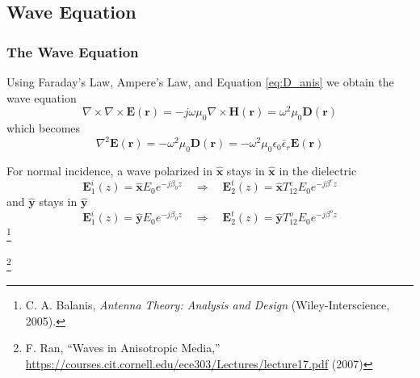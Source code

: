 \documentclass[aspectratio=169,t,xcolor=table]{beamer}
\newcommand{\bv}[1]{\mathbf{#1}}
\newcommand{\vecc}[1]{\mathbf{#1}}
\newcommand\blfootnote[1]{%
  \begingroup
  \renewcommand\thefootnote{}\footnote[frame]{\tiny #1}%
  \addtocounter{footnote}{-1}%
  \endgroup
}
\begin{document}
\subsection{Wave Equation}
\begin{frame}
    \frametitle{The Wave Equation}
    Using Faraday's Law, Ampere's Law, and Equation \eqref{eq:D_anis} we obtain
    the wave equation \cite{Balanis-2012, Wav_anis}
    \begin{equation}\label{eq:WaveEQ}
        \nabla \times \nabla \times \vecc{E}(\bv{r}) = 
        -j\omega \mu_0 \nabla \times \vecc{H}(\vecc{r}) = 
    \omega^2\mu_0 \vecc{D}(\vecc{r})
    \end{equation}
    which becomes
    \begin{equation}\label{eq:WaveEQ_simp}
        \nabla^2 \vecc{E}(\vecc{r}) =  -\omega^2\mu_0 \vecc{D}(\vecc{r})
        = -\omega^2\mu_0\epsilon_0 \bar{\epsilon}_r \vecc{E}(\vecc{r})
    \end{equation}\pause
    
    For normal incidence, a
    wave polarized in $\bv{\hat{x}}$ stays in $\bv{\hat{x}}$ in the dielectric
    \begin{equation}
        \vecc{E}^i_1(z) = \bv{\hat{x}}E_0 e^{-j\beta_0 z}
        \quad\Rightarrow\quad
        \vecc{E}^t_2(z) = \bv{\hat{x}}T_{12}^{e}E_0 e^{-j\beta^e z}
    \end{equation}\pause
    and $\bv{\hat{y}}$ stays in $\bv{\hat{y}}$
    \begin{equation}
    \vecc{E}^i_1(z) = \bv{\hat{y}}E_0 e^{-j\beta_0 z}
        \quad\Rightarrow\quad
        \vecc{E}^t_2(z) = \bv{\hat{y}}T_{12}^{o}E_0 e^{-j\beta^o z}
    \end{equation}
    \blfootnote{
        \cite{Balanis-2012} C. A. Balanis, 
        \textit{Antenna Theory: Analysis and Design}
        (Wiley-Interscience, 2005).
    }
    \blfootnote{
        \cite{Wav_anis} F. Ran, ``Waves in Anisotropic Media,''
        \url{https://courses.cit.cornell.edu/ece303/Lectures/lecture17.pdf} (2007)
    }
\end{frame}
\end{document}
